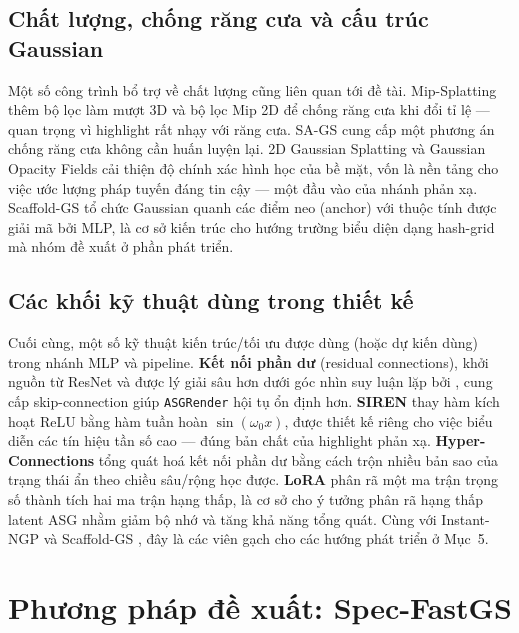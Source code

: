     \subsection{Chất lượng, chống răng cưa và cấu trúc Gaussian}
    Một số công trình bổ trợ về chất lượng cũng liên quan tới đề tài. Mip-Splatting
    \cite{mipsplatting} thêm bộ lọc làm mượt 3D và bộ lọc Mip 2D để chống răng cưa
    khi đổi tỉ lệ — quan trọng vì highlight rất nhạy với răng cưa. SA-GS
    \cite{sags} cung cấp một phương án chống răng cưa không cần huấn luyện lại. 2D
    Gaussian Splatting \cite{twodgs} và Gaussian Opacity Fields \cite{gof} cải thiện
    độ chính xác hình học của bề mặt, vốn là nền tảng cho việc ước lượng pháp tuyến
    đáng tin cậy — một đầu vào của nhánh phản xạ. Scaffold-GS \cite{scaffoldgs} tổ
    chức Gaussian quanh các điểm neo (anchor) với thuộc tính được giải mã bởi MLP,
    là cơ sở kiến trúc cho hướng trường biểu diện dạng hash-grid mà nhóm đề xuất ở
    phần phát triển.

    \subsection{Các khối kỹ thuật dùng trong thiết kế}
    Cuối cùng, một số kỹ thuật kiến trúc/tối ưu được dùng (hoặc dự kiến dùng) trong
    nhánh MLP và pipeline. \textbf{Kết nối phần dư} (residual connections), khởi
    nguồn từ ResNet \cite{resnet} và được lý giải sâu hơn dưới góc nhìn suy luận lặp
    bởi \cite{resiterative}, cung cấp skip-connection giúp \texttt{ASGRender} hội tụ
    ổn định hơn. \textbf{SIREN} \cite{siren} thay hàm kích hoạt ReLU bằng hàm tuần
    hoàn $\sin(\omega_0 x)$, được thiết kế riêng cho việc biểu diễn các tín hiệu tần
    số cao — đúng bản chất của highlight phản xạ. \textbf{Hyper-Connections}
    \cite{hyperconn} tổng quát hoá kết nối phần dư bằng cách trộn nhiều bản sao của
    trạng thái ẩn theo chiều sâu/rộng học được. \textbf{LoRA} \cite{lora} phân rã
    một ma trận trọng số thành tích hai ma trận hạng thấp, là cơ sở cho ý tưởng phân
    rã hạng thấp latent ASG nhằm giảm bộ nhớ và tăng khả năng tổng quát. Cùng với
    Instant-NGP \cite{instantngp} và Scaffold-GS \cite{scaffoldgs}, đây là các viên
    gạch cho các hướng phát triển ở Mục~5.

\newpage
\section{Phương pháp đề xuất: Spec-FastGS}

